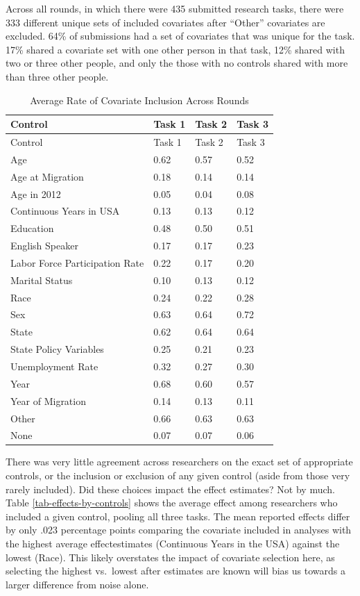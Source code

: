 \documentclass[
  letterpaper,
  DIV=11,
  numbers=noendperiod]{scrartcl}
\begin{document}
Across all rounds, in which there were 435 submitted research tasks,
there were 333 different unique sets of included covariates after
``Other'' covariates are excluded. 64\% of submissions had a set of
covariates that was unique for the task. 17\% shared a covariate set
with one other person in that task, 12\% shared with two or three other
people, and only the those with no controls shared with more than three
other people.

\begin{longtable}[]{@{}llll@{}}
\caption{Average Rate of Covariate Inclusion Across Rounds
\label{tab-controls-across-rounds}}\tabularnewline
\toprule\noalign{}
Control & Task 1 & Task 2 & Task 3 \\
\midrule\noalign{}
\endfirsthead
\toprule\noalign{}
Control & Task 1 & Task 2 & Task 3 \\
\midrule\noalign{}
\endhead
\bottomrule\noalign{}
\endlastfoot
Age & 0.62 & 0.57 & 0.52 \\
Age at Migration & 0.18 & 0.14 & 0.14 \\
Age in 2012 & 0.05 & 0.04 & 0.08 \\
Continuous Years in USA & 0.13 & 0.13 & 0.12 \\
Education & 0.48 & 0.50 & 0.51 \\
English Speaker & 0.17 & 0.17 & 0.23 \\
Labor Force Participation Rate & 0.22 & 0.17 & 0.20 \\
Marital Status & 0.10 & 0.13 & 0.12 \\
Race & 0.24 & 0.22 & 0.28 \\
Sex & 0.63 & 0.64 & 0.72 \\
State & 0.62 & 0.64 & 0.64 \\
State Policy Variables & 0.25 & 0.21 & 0.23 \\
Unemployment Rate & 0.32 & 0.27 & 0.30 \\
Year & 0.68 & 0.60 & 0.57 \\
Year of Migration & 0.14 & 0.13 & 0.11 \\
Other & 0.66 & 0.63 & 0.63 \\
None & 0.07 & 0.07 & 0.06 \\
\end{longtable}

There was very little agreement across researchers on the exact set of
appropriate controls, or the inclusion or exclusion of any given control
(aside from those very rarely included). Did these choices impact the
effect estimates? Not by much. Table \ref{tab-effects-by-controls} shows
the average effect among researchers who included a given control,
pooling all three tasks. The mean reported effects differ by only .023
percentage points comparing the covariate included in analyses with the
highest average effectestimates (Continuous Years in the USA) against
the lowest (Race). This likely overstates the impact of covariate
selection here, as selecting the highest vs.~lowest after estimates are
known will bias us towards a larger difference from noise alone.
\end{document}

